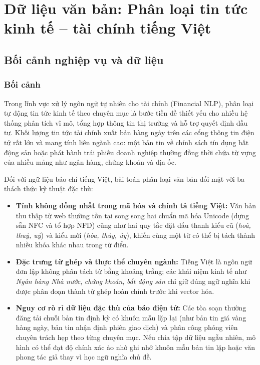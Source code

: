 \section{Dữ liệu văn bản: Phân loại tin tức kinh tế -- tài chính tiếng Việt}
\label{sec:text}

\subsection{Bối cảnh nghiệp vụ và dữ liệu}
\label{subsec:text_context}

\subsubsection{Bối cảnh}
Trong lĩnh vực xử lý ngôn ngữ tự nhiên cho tài chính (Financial NLP), phân loại tự động tin tức kinh tế theo chuyên mục là bước tiền đề thiết yếu cho nhiều hệ thống phân tích vĩ mô, tổng hợp thông tin thị trường và hỗ trợ quyết định đầu tư. Khối lượng tin tức tài chính xuất bản hàng ngày trên các cổng thông tin điện tử rất lớn và mang tính liên ngành cao: một bản tin về chính sách tín dụng bất động sản hoặc phát hành trái phiếu doanh nghiệp thường đồng thời chứa từ vựng của nhiều mảng như ngân hàng, chứng khoán và địa ốc.

Đối với ngữ liệu báo chí tiếng Việt, bài toán phân loại văn bản đối mặt với ba thách thức kỹ thuật đặc thù:
\begin{itemize}[leftmargin=*]
  \item \textbf{Tính không đồng nhất trong mã hóa và chính tả tiếng Việt:} Văn bản thu thập từ web thường tồn tại song song hai chuẩn mã hóa Unicode (dựng sẵn NFC và tổ hợp NFD) cũng như hai quy tắc đặt dấu thanh kiểu cũ (\textit{hoà, thuỷ, uỷ}) và kiểu mới (\textit{hòa, thủy, ủy}), khiến cùng một từ có thể bị tách thành nhiều khóa khác nhau trong từ điển.
  \item \textbf{Đặc trưng từ ghép và thực thể chuyên ngành:} Tiếng Việt là ngôn ngữ đơn lập không phân tách từ bằng khoảng trắng; các khái niệm kinh tế như \textit{Ngân hàng Nhà nước}, \textit{chứng khoán}, \textit{bất động sản} chỉ giữ đúng ngữ nghĩa khi được phân đoạn thành từ ghép hoàn chỉnh trước khi vector hóa.
  \item \textbf{Nguy cơ rò rỉ dữ liệu đặc thù của báo điện tử:} Các tòa soạn thường đăng tải chuỗi bản tin định kỳ có khuôn mẫu lặp lại (như bản tin giá vàng hàng ngày, bản tin nhận định phiên giao dịch) và phân công phóng viên chuyên trách hẹp theo từng chuyên mục. Nếu chia tập dữ liệu ngẫu nhiên, mô hình có thể đạt độ chính xác ảo nhờ ghi nhớ khuôn mẫu bản tin lặp hoặc văn phong tác giả thay vì học ngữ nghĩa chủ đề.
\end{itemize}

